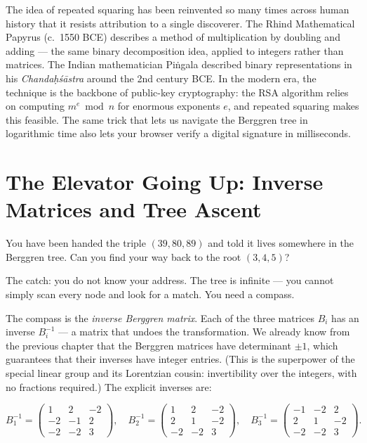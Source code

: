 The idea of repeated squaring has been reinvented so many times across human history that it resists attribution to a single discoverer. The Rhind Mathematical Papyrus (c.~1550 BCE) describes a method of multiplication by doubling and adding --- the same binary decomposition idea, applied to integers rather than matrices. The Indian mathematician Piṅgala described binary representations in his \emph{Chandaḥśāstra} around the 2nd century BCE. In the modern era, the technique is the backbone of public-key cryptography: the RSA algorithm relies on computing \(m^e \bmod n\) for enormous exponents \(e\), and repeated squaring makes this feasible. The same trick that lets us navigate the Berggren tree in logarithmic time also lets your browser verify a digital signature in milliseconds.



\section{The Elevator Going Up: Inverse Matrices and Tree Ascent}\label{ch3-the-elevator-going-up-inverse-matrices-and-tree-ascent}

You have been handed the triple \((39, 80, 89)\) and told it lives somewhere in the Berggren tree. Can you find your way back to the root \((3, 4, 5)\)?

The catch: you do not know your address. The tree is infinite --- you cannot simply scan every node and look for a match. You need a compass.

The compass is the \emph{inverse Berggren matrix}. Each of the three matrices \(B_i\) has an inverse \(B_i^{-1}\) --- a matrix that undoes the transformation. We already know from the previous chapter that the Berggren matrices have determinant \(\pm 1\), which guarantees that their inverses have integer entries. (This is the superpower of the special linear group and its Lorentzian cousin: invertibility over the integers, with no fractions required.) The explicit inverses are:

\[B_1^{-1} = \begin{pmatrix} 1 & 2 & -2 \\ -2 & -1 & 2 \\ -2 & -2 & 3 \end{pmatrix}, \quad B_2^{-1} = \begin{pmatrix} 1 & 2 & -2 \\ 2 & 1 & -2 \\ -2 & -2 & 3 \end{pmatrix}, \quad B_3^{-1} = \begin{pmatrix} -1 & -2 & 2 \\ 2 & 1 & -2 \\ -2 & -2 & 3 \end{pmatrix}.\]

